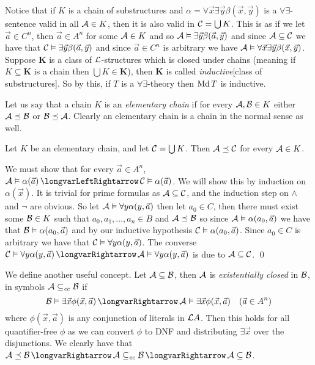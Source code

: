 Notice that if $K$ is a chain of substructures and $\alpha=\forall\vec x\exists\vec y\beta(\vec x,\vec y)$ is a $\forall\exists$-sentence valid in all ${\cal A}\in K$, then it is also valid in
${\cal C}=\bigcup K$.
This is as if we let $\vec a\in C^n$, then $\vec a\in A^n$ for some ${\cal A}\in K$ and so ${\cal A}\vDash\exists\vec y\beta(\vec a,\vec y)$ and since ${\cal A}\subseteq{\cal C}$ we have that
${\cal C}\vDash\exists\vec y\beta(\vec a,\vec y)$ and since $\vec a\in C^n$ is arbitrary we have ${\cal A}\vDash\forall\vec x\exists\vec y\beta(\vec x,\vec y)$.
Suppose $\boldsymbol K$ is a class of ${\cal L}$-structures which is closed under chains (meaning if $K\subseteq\boldsymbol K$ is a chain then $\bigcup K\in\boldsymbol K$), then $\boldsymbol K$ is called
{\it inductive}[class of substructures].
So by this, if $T$ is a $\forall\exists$-theory then $\mathop{\rm Md} T$ is inductive.

Let us say that a chain $K$ is an {\it elementary chain} if for every ${\cal A},{\cal B}\in K$ either ${\cal A}\preceq{\cal B}$ or ${\cal B}\preceq{\cal A}$.
Clearly an elementary chain is a chain in the normal sense as well.

\blemm[title=Tarski's Chain Lemma, name=tarskichainlemma]

    Let $K$ be an elementary chain, and let ${\cal C}=\bigcup K$.
    Then ${\cal A}\preceq{\cal C}$ for every ${\cal A}\in K$.

\elemm

We must show that for every $\vec a\in A^n$, ${\cal A}\vDash\alpha(\vec a)\iff{\cal C}\vDash\alpha(\vec a)$.
We will show this by induction on $\alpha(\vec x)$.
It is trivial for prime formulas as ${\cal A}\subseteq{\cal C}$, and the induction step on $\land$ and $\neg$ are obvious.
So let ${\cal A}\vDash\forall y\alpha(y,\vec a)$ then let $a_0\in C$, then there must exist some ${\cal B}\in K$ such that $a_0,a_1,\dots,a_n\in B$ and ${\cal A}\preceq{\cal B}$ so since
${\cal A}\vDash\alpha(a_0,\vec a)$ we have that ${\cal B}\vDash\alpha(a_0,\vec a)$ and by our inductive hypothesis ${\cal C}\vDash\alpha(a_0,\vec a)$.
Since $a_0\in C$ is arbitrary we have that ${\cal C}\vDash\forall y\alpha(y,\vec a)$.
The converse ${\cal C}\vDash\forall y\alpha(y,\vec a)\implies{\cal A}\vDash\forall y\alpha(y,\vec a)$ is due to ${\cal A}\subseteq{\cal C}$.
\qed

We define another useful concept.
Let ${\cal A}\subseteq{\cal B}$, then ${\cal A}$ is {\it existentially closed} in ${\cal B}$, in symbols ${\cal A}\subseteq_{\it ec}{\cal B}$ if
$$ {\cal B}\vDash\exists\vec x\phi(\vec x,\vec a)\implies{\cal A}\vDash\exists\vec x\phi(\vec x,\vec a)\quad (\vec a\in A^n) $$
where $\phi(\vec x,\vec a)$ is any conjunction of literals in ${\cal L}A$.
Then this holds for all quantifier-free $\phi$ as we can convert $\phi$ to DNF and distributing $\exists\vec x$ over the disjunctions.
We clearly have that ${\cal A}\preceq{\cal B}\implies{\cal A}\subseteq_{\it ec}{\cal B}\implies{\cal A}\subseteq{\cal B}$.

